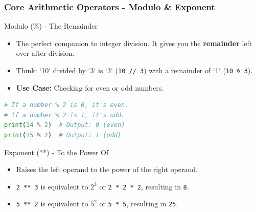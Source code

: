 \documentclass{beamer}
\begin{document}
\begin{frame}[fragile]
    \frametitle{Core Arithmetic Operators - Modulo \& Exponent}

    \begin{block}{Modulo (\%) - The Remainder}
        \begin{itemize}
            \item The perfect companion to integer division. It gives you the \textbf{remainder} left over after division.
            \item Think: `10` divided by `3` is `3` (\texttt{10 // 3}) with a remainder of `1` (\texttt{10 \% 3}).
            \item \textbf{Use Case:} Checking for even or odd numbers.
        \end{itemize}
        \begin{lstlisting}[language=Python]
# If a number % 2 is 0, it's even.
# If a number % 2 is 1, it's odd.
print(14 % 2)  # Output: 0 (even)
print(15 % 2)  # Output: 1 (odd)
        \end{lstlisting}
    \end{block}

    \begin{block}{Exponent (**) - To the Power Of}
        \begin{itemize}
            \item Raises the left operand to the power of the right operand.
            \item \texttt{2 ** 3} is equivalent to $2^3$ or \texttt{2 * 2 * 2}, resulting in \texttt{8}.
            \item \texttt{5 ** 2} is equivalent to $5^2$ or \texttt{5 * 5}, resulting in \texttt{25}.
        \end{itemize}
    \end{block}
\end{frame}
\end{document}
